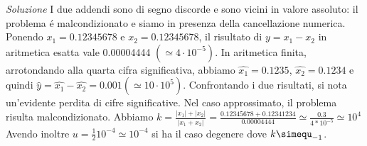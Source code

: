 \documentclass[20pt,a4paper]{book}
\begin{document}
\textit{Soluzione} 
I due addendi sono di segno discorde e sono vicini in valore assoluto: il problema \'e malcondizionato e siamo in presenza della cancellazione numerica. 
Ponendo \begin{math}{x_{1}=0.12345678}\end{math} e \begin{math}{x_{2}=0.12345678}\end{math}, il risultato di \begin{math}{y=x_{1}-x_{2}}\end{math} in aritmetica esatta vale 0.00004444 \begin{math}{(\simeq 4\cdot 10^{-5})}\end{math}.
In aritmetica finita, arrotondando alla quarta cifra significativa, abbiamo \begin{math}{\widehat{x_{1}}=0.1235}\end{math}, \begin{math}{\widehat{x_{2}}=0.1234}\end{math} e quindi \begin{math}{\widehat{y}=\widehat{x_{1}}-\widehat{x_{2}}=0.001(\simeq10\cdot10^{5})}\end{math}. 
Confrontando i due risultati, si nota un'evidente perdita di cifre significative.
Nel caso approssimato, il problema risulta malcondizionato.
Abbiamo \begin{math} k= \frac{|x_{1}| + |x_{2}|}{|x_{1}+x_{2}|} = \frac{0.12345678+0.12341234}{0.00004444} \simeq \frac{0.3}{4*10^{-5}} \simeq 10^{4}\end{math}
Avendo inoltre \begin{math} u=\frac{1}{2} 10^{-4} \simeq 10^{-4}\end{math} si ha il caso degenere dove  \begin{math} k\simequ_{-1} \end{math}.
\end{document}
